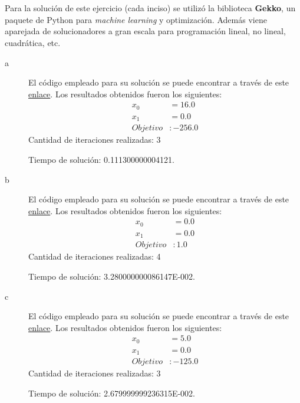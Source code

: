\documentclass[titlepage, 11pt]{scrartcl}
\begin{document}
	\section{}{
		Para la soluci\'on de este ejercicio (cada inciso) se utiliz\'o la biblioteca \textbf{Gekko}, un paquete de Python para \textit{machine learning} y optimizaci\'on. Adem\'as viene aparejada de solucionadores a gran escala para programaci\'on lineal, no lineal, cuadr\'atica, etc.
		
		
		\begin{description}
			\item[a] El c\'odigo empleado para su soluci\'on se puede encontrar a trav\'es de este \href{lab2ex2a.py}{enlace}. Los resultados obtenidos fueron los siguientes:
				\begin{align*}
					x_0 &= 16.0\\
					x_1 &= 0.0\\
					Objetivo &: -256.0 
				\end{align*}
			Cantidad de iteraciones realizadas: 3
			
			Tiempo de soluci\'on: 0.111300000004121.
			
			\item[b] El c\'odigo empleado para su soluci\'on se puede encontrar a trav\'es de este \href{lab2ex2b.py}{enlace}. Los resultados obtenidos fueron los siguientes:
			\begin{align*}
			x_0 &= 0.0\\
			x_1 &= 0.0\\
			Objetivo &: 1.0 
			\end{align*}
			Cantidad de iteraciones realizadas: 4
			
			Tiempo de soluci\'on: 3.280000000086147E-002.
			
			\item[c] El c\'odigo empleado para su soluci\'on se puede encontrar a trav\'es de este \href{lab2ex2c.py}{enlace}. Los resultados obtenidos fueron los siguientes:
			\begin{align*}
			x_0 &= 5.0\\
			x_1 &= 0.0\\
			Objetivo &: -125.0 
			\end{align*}
			Cantidad de iteraciones realizadas: 3
			
			Tiempo de soluci\'on: 2.679999999236315E-002.
		\end{description}
	
	}
        
\end{document}
